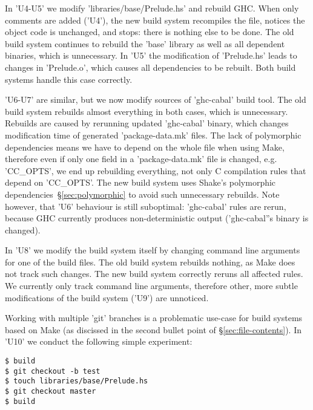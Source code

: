 
In \lst'U4-U5' we modify \lst'libraries/base/Prelude.hs' and rebuild GHC.
When only comments are added (\lst'U4'), the new build system recompiles the
file, notices the object code is unchanged, and stops: there is nothing else to
be done. The old build system continues to rebuild the \lst'base' library as
well as all dependent binaries, which is unnecessary. In \lst'U5' the
modification of \lst'Prelude.hs' leads to changes in \lst'Prelude.o', which
causes all dependencies to be rebuilt. Both build systems handle this case
correctly.

\lst'U6-U7' are similar, but we now modify sources of \lst'ghc-cabal' build
tool. The old build system rebuilds almost everything in both cases,
which is unnecessary. Rebuilds are caused by rerunning updated \lst'ghc-cabal'
binary, which changes modification time of generated \lst'package-data.mk'
files. The lack of polymorphic dependencies means we have to depend on the whole
file when using Make, therefore even if only one field in a
\lst'package-data.mk' file is changed, e.g. \lst'CC_OPTS', we end up
rebuilding everything, not only C compilation rules that depend on
\lst'CC_OPTS'. The new build system uses Shake's polymorphic
dependencies~\S\ref{sec:polymorphic} to avoid such unnecessary rebuilds. Note
however, that \lst'U6' behaviour is still suboptimal: \lst'ghc-cabal' rules
are rerun, because GHC currently produces non-deterministic output
(\lst'ghc-cabal''s binary is changed).

In \lst'U8' we modify the build system itself by changing command line
arguments for one of the build files. The old build system rebuilds nothing,
as Make does not track such changes. The new build system correctly reruns all
affected rules. We currently only track command line arguments, therefore other,
more subtle modifications of the build system (\lst'U9') are unnoticed.

Working with multiple \lst'git' branches is a problematic use-case for build
systems based on Make (as discissed in the second bullet point of
\S\ref{sec:file-contents}). In \lst'U10' we conduct the following simple
experiment:

\begin{lstlisting}
$ build
$ git checkout -b test
$ touch libraries/base/Prelude.hs
$ git checkout master
$ build
\end{lstlisting}

